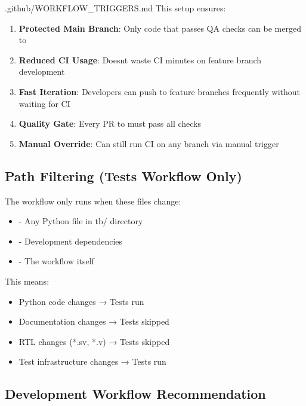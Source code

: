 \begin{relocated}{.github/WORKFLOW_TRIGGERS.md}
This setup ensures:

\begin{enumerate}
\def\labelenumi{\arabic{enumi}.}
\tightlist
\item
  \textbf{Protected Main Branch}: Only code that passes QA checks can be
  merged to 
\item
  \textbf{Reduced CI Usage}: Doesn\textquotesingle t waste CI minutes on
  feature branch development
\item
  \textbf{Fast Iteration}: Developers can push to feature branches
  frequently without waiting for CI
\item
  \textbf{Quality Gate}: Every PR to  must pass all checks
\item
  \textbf{Manual Override}: Can still run CI on any branch via manual
  trigger
\end{enumerate}

\subsection{Path Filtering (Tests Workflow Only)}\label{um:flow:workflow-triggers:path-filtering-tests-workflow-only}

The  workflow only runs when these files change:

\begin{itemize}
\tightlist
\item
   - Any Python file in tb/ directory
\item
   - Development dependencies
\item
   - The workflow itself
\end{itemize}

This means:

\begin{itemize}
\tightlist
\item
  \ok{} Python code changes → Tests run
\item
  \bad{} Documentation changes → Tests skipped
\item
  \bad{} RTL changes (*.sv, *.v) → Tests skipped
\item
  \ok{} Test infrastructure changes → Tests run
\end{itemize}

\subsection{Development Workflow Recommendation}\label{um:flow:workflow-triggers:development-workflow-recommendation}


\end{relocated}

